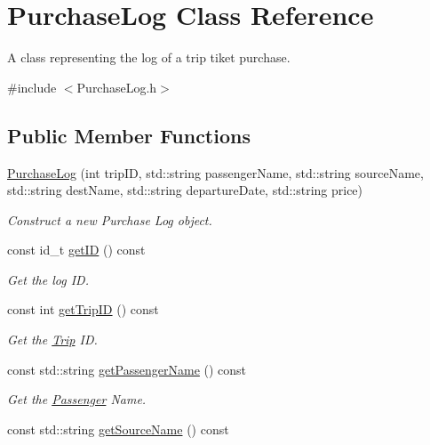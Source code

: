 \hypertarget{classPurchaseLog}{}\section{Purchase\+Log Class Reference}
\label{classPurchaseLog}


A class representing the log of a trip tiket purchase.  




{\ttfamily \#include $<$Purchase\+Log.\+h$>$}

\subsection*{Public Member Functions}
\begin{DoxyCompactItemize}
\item 
\mbox{\hyperlink{classPurchaseLog_a383409dbd9d038ce4cc2a9a8ef2184c8}{Purchase\+Log}} (int trip\+ID, std\+::string passenger\+Name, std\+::string source\+Name, std\+::string dest\+Name, std\+::string departure\+Date, std\+::string price)
\begin{DoxyCompactList}\small\item\em Construct a new Purchase Log object. \end{DoxyCompactList}\item 
const id\+\_\+t \mbox{\hyperlink{classPurchaseLog_a0320e9136e01de2a9652db55c1739d6f}{get\+ID}} () const
\begin{DoxyCompactList}\small\item\em Get the log ID. \end{DoxyCompactList}\item 
const int \mbox{\hyperlink{classPurchaseLog_ac50b5fd8eb060b67405e5234e3cc604b}{get\+Trip\+ID}} () const
\begin{DoxyCompactList}\small\item\em Get the \mbox{\hyperlink{classTrip}{Trip}} ID. \end{DoxyCompactList}\item 
const std\+::string \mbox{\hyperlink{classPurchaseLog_a53f354f530d3179139eff0dbcf7aa67b}{get\+Passenger\+Name}} () const
\begin{DoxyCompactList}\small\item\em Get the \mbox{\hyperlink{classPassenger}{Passenger}} Name. \end{DoxyCompactList}\item 
const std\+::string \mbox{\hyperlink{classPurchaseLog_a5c994361a33f18ad521a2af034a6cd8f}{get\+Source\+Name}} () const

\end{DoxyCompactItemize}
